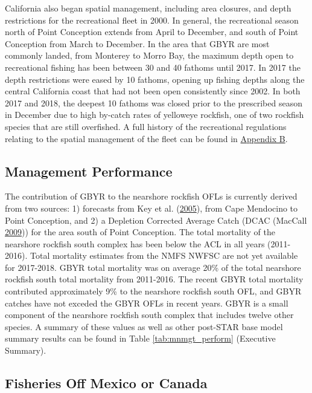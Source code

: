 \documentclass[12pt,]{article}
\begin{document}
California also began spatial management, including area closures, and
depth restrictions for the recreational fleet in 2000. In general, the
recreational season north of Point Conception extends from April to
December, and south of Point Conception from March to December. In the
area that GBYR are most commonly landed, from Monterey to Morro Bay, the
maximum depth open to recreational fishing has been between 30 and 40
fathoms until 2017. In 2017 the depth restrictions were eased by 10
fathoms, opening up fishing depths along the central California coast
that had not been open consistently since 2002. In both 2017 and 2018,
the deepest 10 fathoms was closed prior to the prescribed season in
December due to high by-catch rates of yelloweye rockfish, one of two
rockfish species that are still overfished. A full history of the
recreational regulations relating to the spatial management of the fleet
can be found in
\protect\hyperlink{appendix-b.-californias-recreational-fishery-regulations}{Appendix
B}.

\subsection{Management Performance}\label{management-performance-1}

The contribution of GBYR to the nearshore rockfish OFLs is currently
derived from two sources: 1) forecasts from Key et al.
(\protect\hyperlink{ref-Key2005}{2005}), from Cape Mendocino to Point
Conception, and 2) a Depletion Corrected Average Catch (DCAC (MacCall
\protect\hyperlink{ref-MacCall2009}{2009})) for the area south of Point
Conception. The total mortality of the nearshore rockfish south complex
has been below the ACL in all years (2011-2016). Total mortality
estimates from the NMFS NWFSC are not yet available for 2017-2018. GBYR
total mortality was on average 20\% of the total nearshore rockfish
south total mortality from 2011-2016. The recent GBYR total mortality
contributed approximately 9\% to the nearshore rockfish south OFL, and
GBYR catches have not exceded the GBYR OFLs in recent years. GBYR is a
small component of the nearshore rockfish south complex that includes
twelve other species. A summary of these values as well as other
post-STAR base model summary results can be found in Table
\ref{tab:mnmgt_perform} (Executive Summary).

\subsection{Fisheries Off Mexico or
Canada}\label{fisheries-off-mexico-or-canada}
\end{document}
